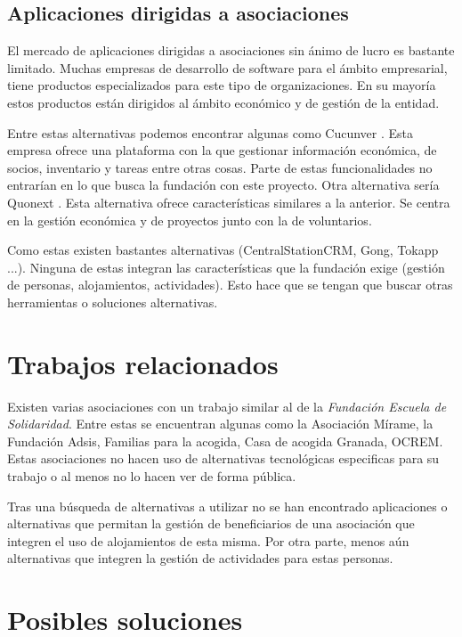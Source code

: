 \subsection{Aplicaciones dirigidas a asociaciones}

El mercado de aplicaciones dirigidas a asociaciones sin ánimo de lucro es bastante limitado. Muchas empresas de desarrollo de software para el ámbito empresarial, tiene productos especializados para este tipo de organizaciones. En su mayoría estos productos están dirigidos al ámbito económico y de gestión de la entidad. 

Entre estas alternativas podemos encontrar algunas como Cucunver \cite{cucunver}. Esta empresa ofrece una plataforma con la que gestionar información económica, de socios, inventario y tareas entre otras cosas. Parte de estas funcionalidades no entrarían en lo que busca la fundación con este proyecto. Otra alternativa sería Quonext \cite{quonext}. Esta alternativa ofrece características similares a la anterior. Se centra en la gestión económica y de proyectos junto con la de voluntarios.

Como estas existen bastantes alternativas (CentralStationCRM, Gong, Tokapp ...). Ninguna de estas integran las características que la fundación exige (gestión de personas, alojamientos, actividades). Esto hace que se tengan que buscar otras herramientas o soluciones alternativas. 

\section{Trabajos relacionados}

Existen varias asociaciones con un trabajo similar al de la \textit{Fundación Escuela de Solidaridad}. Entre estas se encuentran algunas como la Asociación Mírame, la Fundación Adsis, Familias para la acogida, Casa de acogida Granada, OCREM. Estas asociaciones no hacen uso de alternativas tecnológicas especificas para su trabajo o al menos no lo hacen ver de forma pública. 

Tras una búsqueda de alternativas a utilizar no se han encontrado aplicaciones o alternativas que permitan la gestión de beneficiarios de una asociación que integren el uso de alojamientos de esta misma. Por otra parte, menos aún alternativas que integren la gestión de actividades para estas personas.

\section{Posibles soluciones}

